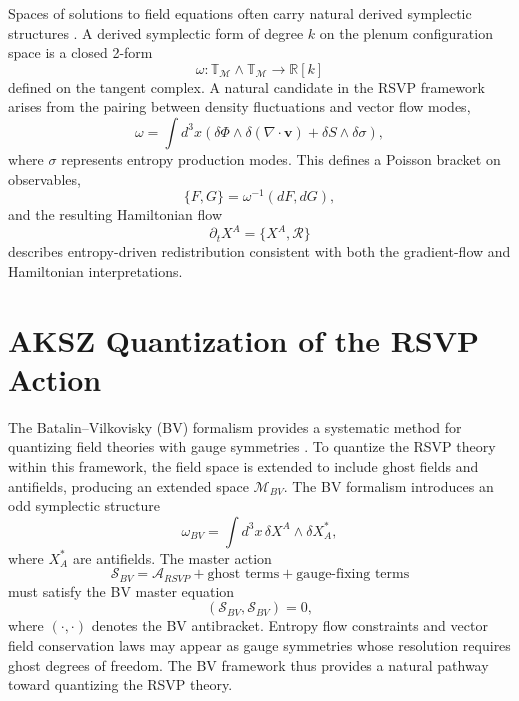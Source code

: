 \documentclass[12pt,a4paper]{article}
\theoremstyle{plain}
\theoremstyle{definition}
\theoremstyle{remark}
\begin{document}
Spaces of solutions to field equations often carry natural derived
symplectic structures \cite{CostelloGwilliam,FreedHopkins}. A derived
symplectic form of degree $k$ on the plenum configuration space is a
closed 2-form
\begin{equation}
\omega : \mathbb{T}_{\mathcal{M}} \wedge \mathbb{T}_{\mathcal{M}}
\rightarrow \mathbb{R}[k]
\end{equation}
defined on the tangent complex. A natural candidate in the RSVP
framework arises from the pairing between density fluctuations and
vector flow modes,
\begin{equation}
\omega = \int d^3x\left(
\delta\Phi \wedge \delta(\nabla \cdot \mathbf{v})
+ \delta S \wedge \delta\sigma
\right),
\end{equation}
where $\sigma$ represents entropy production modes. This defines a
Poisson bracket on observables,
\begin{equation}
\{F,G\} = \omega^{-1}(dF,dG),
\end{equation}
and the resulting Hamiltonian flow
\begin{equation}
\partial_t X^A = \{X^A, \mathcal{R}\}
\end{equation}
describes entropy-driven redistribution consistent with both the
gradient-flow and Hamiltonian interpretations.

\section{AKSZ Quantization of the RSVP Action}

The Batalin--Vilkovisky (BV) formalism provides a systematic method
for quantizing field theories with gauge symmetries
\cite{CostelloGwilliam,FreedHopkins}. To quantize the RSVP theory
within this framework, the field space is extended to include ghost
fields and antifields, producing an extended space $\mathcal{M}_{BV}$.
The BV formalism introduces an odd symplectic structure
\begin{equation}
\omega_{BV} = \int d^3x\, \delta X^A \wedge \delta X_A^\ast,
\end{equation}
where $X_A^\ast$ are antifields. The master action
\begin{equation}
\mathcal{S}_{BV} = \mathcal{A}_{RSVP}
+ \text{ghost terms} + \text{gauge-fixing terms}
\end{equation}
must satisfy the BV master equation
\begin{equation}
(\mathcal{S}_{BV},\mathcal{S}_{BV}) = 0,
\end{equation}
where $(\cdot,\cdot)$ denotes the BV antibracket. Entropy flow
constraints and vector field conservation laws may appear as gauge
symmetries whose resolution requires ghost degrees of freedom. The
BV framework thus provides a natural pathway toward quantizing the
RSVP theory.
\end{document}
